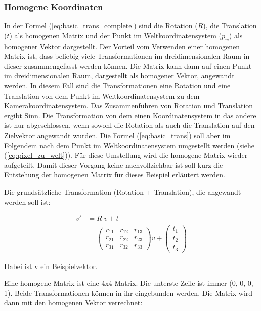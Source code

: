 		\subsubsection{Homogene Koordinaten}
		In der Formel (\ref{eq:basic_trans_complete}) sind die Rotation (\( R \)), die Translation (\( t \)) als homogenen Matrix und  der Punkt im Weltkoordinatensystem (\( p_w \)) als homogener Vektor dargestellt. Der Vorteil vom Verwenden einer homogenen Matrix ist, dass beliebig viele Transformationen im dreidimensionalen Raum in dieser zusammengefasst werden können. Die Matrix kann dann auf einen Punkt im dreidimensionalen Raum, dargestellt als homogener Vektor, angewandt werden. In diesem Fall sind die Transformationen eine Rotation und eine Translation von dem Punkt im Weltkoordinatensystem zu dem Kamerakoordinatensystem. Das Zusammenführen von Rotation und Translation ergibt Sinn. Die Transformation von dem einen Koordinatensystem in das andere ist nur abgeschlossen, wenn sowohl die Rotation als auch die Translation auf den Zielvektor angewandt wurden. Die Formel (\ref{eq:basic_trans}) soll aber im Folgendem nach dem Punkt im Weltkoordinatensystem umgestellt werden (siehe (\ref{eq:pixel_zu_welt})). Für diese Umstellung wird die homogene Matrix wieder aufgeteilt. Damit dieser Vorgang keine nachvollziehbar ist soll kurz die Entstehung der homogenen Matrix für dieses Beispiel erläutert werden.
		
		Die grundsätzliche Transformation (Rotation + Translation), die angewandt werden soll ist:
		
		\begin{equation}
			\begin{aligned}
				v' &= R \; v + t \\
				&= \begin{pmatrix}
				r_{11} & r_{12} & r_{13} \\ 
				r_{21} & r_{22} & r_{23} \\ 
				r_{31} & r_{32} & r_{33}
				\end{pmatrix} v + \begin{pmatrix}
				t_1 \\ t_2 \\ t_3
				\end{pmatrix}
			\end{aligned}
		\label{eq:rot_trans}
		\end{equation}
		
		Dabei ist v ein Beispielvektor.
		
		Eine homogene Matrix ist eine 4x4-Matrix. Die unterste Zeile ist immer (0, 0, 0, 1). Beide Transformationen können in ihr eingebunden werden. Die Matrix wird dann mit den homogenen Vektor verrechnet:
		
